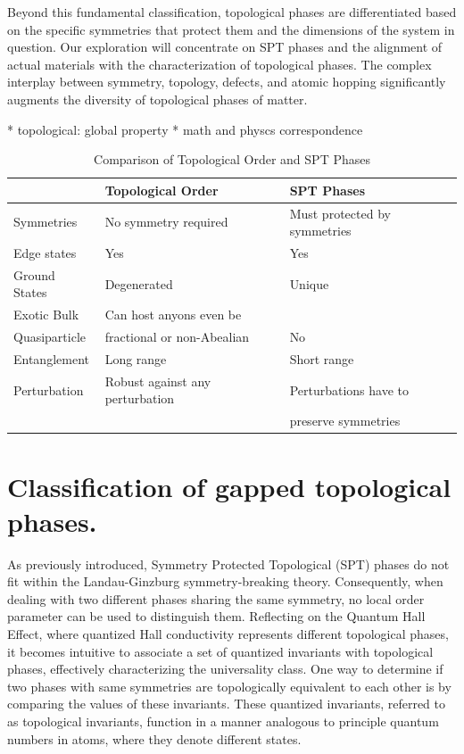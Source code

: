 Beyond this fundamental classification, topological phases are differentiated based on the specific symmetries that protect them and the dimensions of the system in question. Our exploration will concentrate on SPT phases and the alignment of actual materials with the characterization of topological phases. The complex interplay between symmetry, topology, defects, and atomic hopping significantly augments the diversity of topological phases of matter.

* topological: global property
* math and physcs correspondence



\begin{table}[]
\renewcommand{\arraystretch}{1.5}
\label{tab:comparison}
\begin{tabular}{|l|l|l|}
\hline
             & Topological Order & SPT Phases \\\hline
Symmetries   & No symmetry required    &  Must protected by symmetries \\\hline
Edge states  &   Yes   &   Yes  \\\hline
Ground States & Degenerated & Unique \\\hline
Exotic Bulk & Can host anyons even be & \\
Quasiparticle &  fractional or non-Abealian & No \\\hline
Entanglement &  Long range        &  Short range   \\\hline
Perturbation  &  Robust against any perturbation & Perturbations have to\\ 
 & &preserve symmetries\\
\hline
\end{tabular}
\caption{Comparison of Topological Order and SPT Phases}

\end{table}

\section{Classification of gapped topological phases.}
As previously introduced, Symmetry Protected Topological (SPT) phases do not fit within the Landau-Ginzburg symmetry-breaking theory. Consequently, when dealing with two different phases sharing the same symmetry, no local order parameter can be used to distinguish them. Reflecting on the Quantum Hall Effect, where quantized Hall conductivity represents different topological phases, it becomes intuitive to associate a set of quantized invariants with topological phases, effectively characterizing the universality class. One way to determine if two phases with same symmetries are topologically equivalent to each other is by comparing the values of these invariants. 
These quantized invariants, referred to as topological invariants, function in a manner analogous to principle quantum numbers in atoms, where they denote different states.

